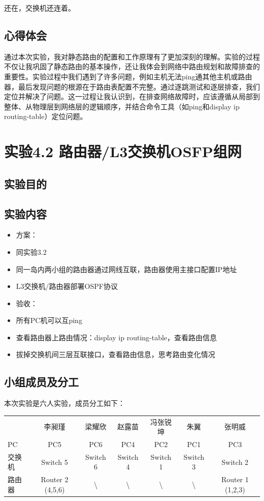 \documentclass{article}
\begin{document}
还在，交换机还连着。

\subsection{心得体会}
通过本次实验，我对静态路由的配置和工作原理有了更加深刻的理解。实验的过程不仅让我巩固了静态路由的基本操作，还让我体会到网络中路由规划和故障排查的重要性。实验过程中我们遇到了许多问题，例如主机无法ping通其他主机或路由器，最后发现问题的根源在于路由表配置不完整。通过逐跳测试和逐层排查，我们定位并解决了问题。这一过程让我认识到，在排查网络故障时，应该遵循从局部到整体、从物理层到网络层的逻辑顺序，并结合命令工具（如ping和display ip routing-table）定位问题。





\newpage\section{实验4.2 路由器/L3交换机OSFP组网}
\subsection{实验目的}

\subsection{实验内容}
\begin{itemize}
    \item 方案：
    \item 同实验3.2
    \item 同一岛内两小组的路由器通过网线互联，路由器使用主接口配置IP地址
    \item L3交换机/路由器部署OSPF协议
    \item 验收：
    \item 所有PC机可以互ping
    \item 查看路由器上路由情况：display ip routing-table，查看路由信息
    \item 拔掉交换机间三层互联接口，查看路由信息，思考路由变化情况
\end{itemize}



\subsection{小组成员及分工}
本次实验是六人实验，成员分工如下：

\begin{tabular}{lcccccc}

    & 李昶瑾 & 梁耀欣 & 赵露苗 & 冯张锐坤 & 朱翼 & 张明威 \\

    PC & PC5 & PC6 & PC4 & PC2 & PC1 & PC3 \\
    交换机 & Switch 5 & Switch 6 & Switch 4 & Switch 1 & Switch 3 & Switch 2 \\
    路由器 & Router 2 (4,5,6) & \textbackslash{} & \textbackslash{} & \textbackslash{} & \textbackslash{} & Router 1 (1,2,3) \\

    \end{tabular}
\end{document}
